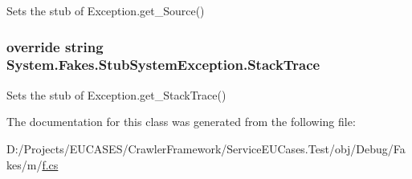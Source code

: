 Sets the stub of Exception.\-get\-\_\-\-Source()

\hypertarget{class_system_1_1_fakes_1_1_stub_system_exception_ac027e37613d48976408ff4da9807af55}{
\subsubsection[{Stack\-Trace}]{\setlength{\rightskip}{0pt plus 5cm}override string System.\-Fakes.\-Stub\-System\-Exception.\-Stack\-Trace\hspace{0.3cm}{\ttfamily [get]}}}\label{class_system_1_1_fakes_1_1_stub_system_exception_ac027e37613d48976408ff4da9807af55}


Sets the stub of Exception.\-get\-\_\-\-Stack\-Trace()



The documentation for this class was generated from the following file\-:\begin{DoxyCompactItemize}
\item 
D\-:/\-Projects/\-E\-U\-C\-A\-S\-E\-S/\-Crawler\-Framework/\-Service\-E\-U\-Cases.\-Test/obj/\-Debug/\-Fakes/m/\hyperlink{m_2f_8cs}{f.\-cs}\end{DoxyCompactItemize}

